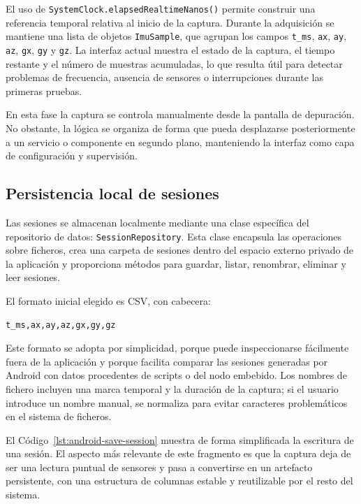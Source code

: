 El uso de \texttt{SystemClock.elapsedRealtimeNanos()} permite construir una referencia temporal relativa al inicio de la captura. Durante la adquisición se mantiene una lista de objetos \texttt{ImuSample}, que agrupan los campos \texttt{t\_ms}, \texttt{ax}, \texttt{ay}, \texttt{az}, \texttt{gx}, \texttt{gy} y \texttt{gz}. La interfaz actual muestra el estado de la captura, el tiempo restante y el número de muestras acumuladas, lo que resulta útil para detectar problemas de frecuencia, ausencia de sensores o interrupciones durante las primeras pruebas.

En esta fase la captura se controla manualmente desde la pantalla de depuración. No obstante, la lógica se organiza de forma que pueda desplazarse posteriormente a un servicio o componente en segundo plano, manteniendo la interfaz como capa de configuración y supervisión.

\subsection{Persistencia local de sesiones}

Las sesiones se almacenan localmente mediante una clase específica del repositorio de datos: \texttt{SessionRepository}. Esta clase encapsula las operaciones sobre ficheros, crea una carpeta de sesiones dentro del espacio externo privado de la aplicación y proporciona métodos para guardar, listar, renombrar, eliminar y leer sesiones.

El formato inicial elegido es CSV, con cabecera:

\begin{verbatim}
t_ms,ax,ay,az,gx,gy,gz
\end{verbatim}

Este formato se adopta por simplicidad, porque puede inspeccionarse fácilmente fuera de la aplicación y porque facilita comparar las sesiones generadas por Android con datos procedentes de scripts o del nodo embebido. Los nombres de fichero incluyen una marca temporal y la duración de la captura; si el usuario introduce un nombre manual, se normaliza para evitar caracteres problemáticos en el sistema de ficheros.

El Código~\ref{lst:android-save-session} muestra de forma simplificada la escritura de una sesión. El aspecto más relevante de este fragmento es que la captura deja de ser una lectura puntual de sensores y pasa a convertirse en un artefacto persistente, con una estructura de columnas estable y reutilizable por el resto del sistema.

